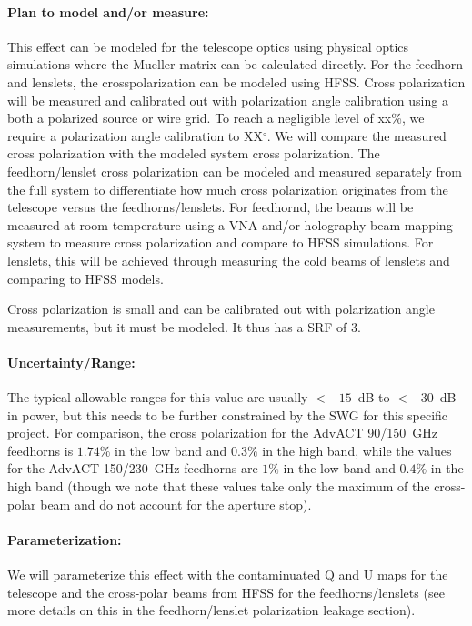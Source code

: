 \paragraph{Plan to model and/or measure:}
This effect can be modeled for the telescope optics using physical optics simulations where the Mueller matrix can be calculated directly. For the feedhorn and lenslets, the crosspolarization can be modeled using HFSS. Cross polarization will be measured and calibrated out with polarization angle calibration using a both a polarized source or wire grid. To reach a negligible level of xx\%, we require a polarization angle calibration to XX$^{\circ}$. We will compare the measured cross polarization with the modeled system cross polarization. The feedhorn/lenslet cross polarization can be modeled and measured separately from the full system to differentiate how much cross polarization originates from the telescope versus the feedhorns/lenslets. For feedhornd, the beams will be measured at room-temperature using a VNA and/or holography beam mapping system to measure cross polarization and compare to HFSS simulations. For lenslets, this will be achieved through measuring the cold beams of lenslets and comparing to HFSS models.

Cross polarization is small and can be calibrated out with polarization angle measurements, but it must be modeled. It thus has a SRF of 3.

\paragraph{Uncertainty/Range:}
The typical allowable ranges for this value are usually $<-15$~dB to $<-30$~dB in power, but this needs to be further constrained by the SWG for this specific project. For comparison, the cross polarization for the AdvACT 90/150~GHz feedhorns is $1.74\%$ in the low band and $0.3\%$ in the high band, while the values for the AdvACT 150/230~GHz feedhorns are $1\%$ in the low band and $0.4\%$ in the high band (though we note that these values take only the maximum of the cross-polar beam and do not account for the aperture stop).

\paragraph{Parameterization:}
We will parameterize this effect with the contaminuated Q and U maps for the telescope and the cross-polar beams from HFSS for the feedhorns/lenslets (see more details on this in the feedhorn/lenslet polarization leakage section).
